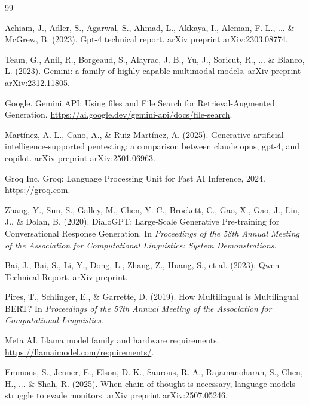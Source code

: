 \documentclass[12pt, a4paper]{article}
\begin{document}
\newpage
\begin{thebibliography}{99}


Achiam, J., Adler, S., Agarwal, S., Ahmad, L., Akkaya, I., Aleman, F. L., ... \& McGrew, B. (2023). Gpt-4 technical report. arXiv preprint arXiv:2303.08774.

Team, G., Anil, R., Borgeaud, S., Alayrac, J. B., Yu, J., Soricut, R., ... \& Blanco, L. (2023). Gemini: a family of highly capable multimodal models. arXiv preprint arXiv:2312.11805.

Google.
\newblock Gemini API: Using files and File Search for Retrieval-Augmented Generation.
\newblock \url{https://ai.google.dev/gemini-api/docs/file-search}.



Martínez, A. L., Cano, A., \& Ruiz-Martínez, A. (2025). Generative artificial intelligence-supported pentesting: a comparison between claude opus, gpt-4, and copilot. arXiv preprint arXiv:2501.06963.

{Groq Inc.}
\newblock Groq: Language Processing Unit for Fast AI Inference, 2024.
\newblock \url{https://groq.com}.


Zhang, Y., Sun, S., Galley, M., Chen, Y.-C., Brockett, C., Gao, X., Gao, J., Liu, J., \& Dolan, B. (2020).
DialoGPT: Large-Scale Generative Pre-training for Conversational Response Generation.
In \textit{Proceedings of the 58th Annual Meeting of the Association for Computational Linguistics: System Demonstrations}.

Bai, J., Bai, S., Li, Y., Dong, L., Zhang, Z., Huang, S., et al. (2023).
Qwen Technical Report.
arXiv preprint.

Pires, T., Schlinger, E., \& Garrette, D. (2019).
How Multilingual is Multilingual BERT?
In \textit{Proceedings of the 57th Annual Meeting of the Association for Computational Linguistics}.

Meta AI.
Llama model family and hardware requirements.
\newblock \url{https://llamaimodel.com/requirements/}.



Emmons, S., Jenner, E., Elson, D. K., Saurous, R. A., Rajamanoharan, S., Chen, H., ... \& Shah, R. (2025). When chain of thought is necessary, language models struggle to evade monitors. arXiv preprint arXiv:2507.05246.


\end{thebibliography}
\end{document}

